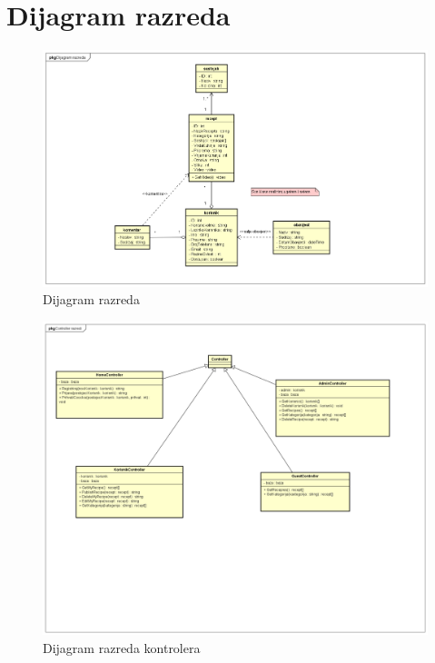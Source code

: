 \section{Dijagram razreda}

\begin{figure}[H]
	\includegraphics[width=\textwidth]{slike/DijagramRazreda.png} %
	\centering
	\caption{Dijagram razreda}
	\label{fig:dijagramraz}
\end{figure}

\begin{figure}[H]
	\includegraphics[width=\textwidth]{slike/ControllerRazredi.png} %
	\centering
	\caption{Dijagram razreda kontrolera}
	\label{fig:dijagramkontr}
\end{figure}

